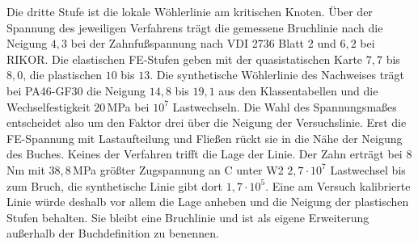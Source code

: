 Die dritte Stufe ist die lokale Wöhlerlinie am kritischen Knoten. Über der Spannung des jeweiligen Verfahrens trägt die gemessene Bruchlinie nach  die Neigung $4{,}3$ bei der Zahnfußspannung nach VDI 2736 Blatt 2 und $6{,}2$ bei RIKOR. Die elastischen FE-Stufen geben mit der quasistatischen Karte $7{,}7$ bis $8{,}0$, die plastischen $10$ bis $13$. Die synthetische Wöhlerlinie des Nachweises trägt bei PA46-GF30 die Neigung $14{,}8$ bis $19{,}1$ aus den Klassentabellen und die Wechselfestigkeit $20$\,MPa bei $10^{7}$ Lastwechseln. Die Wahl des Spannungsmaßes entscheidet also um den Faktor drei über die Neigung der Versuchslinie. Erst die FE-Spannung mit Lastaufteilung und Fließen rückt sie in die Nähe der Neigung des Buches. Keines der Verfahren trifft die Lage der Linie. Der Zahn erträgt bei $8$\,Nm mit $38{,}8$\,MPa größter Zugspannung an C unter W2 $2{,}7 \cdot 10^{7}$ Lastwechsel bis zum Bruch, die synthetische Linie gibt dort $1{,}7 \cdot 10^{5}$. Eine am Versuch kalibrierte Linie würde deshalb vor allem die Lage anheben und die Neigung der plastischen Stufen behalten. Sie bleibt eine Bruchlinie und ist als eigene Erweiterung außerhalb der Buchdefinition zu benennen.


